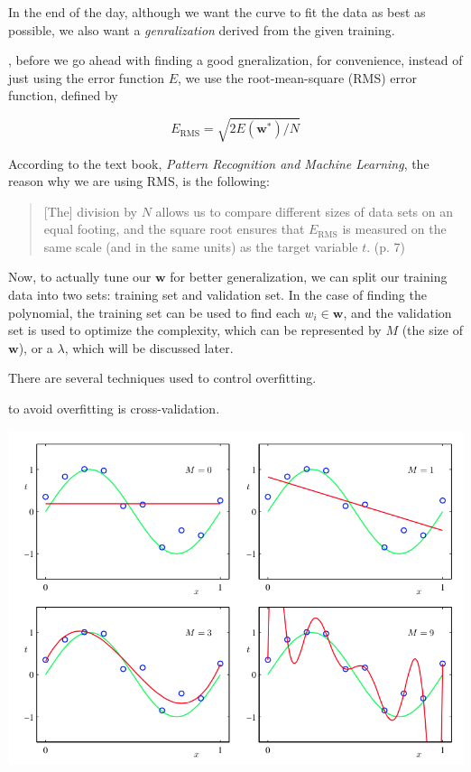 \documentclass{tufte-handout}
\begin{document}
In the end of the day, although we want the curve to fit the data as best as possible, we also want a \textit{genralization} derived from the given training.

, before we go ahead with finding a good gneralization, for convenience, instead of just using the error function $E$, we use the root-mean-square (RMS) error function, defined by

\begin{equation}
  E_{\text{RMS}} = \sqrt{2E(\mathbf{w}^*)/N}
\end{equation}

According to the text book, \textit{Pattern Recognition and Machine Learning}, the reason why we are using RMS, is the following:

\begin{quote}
  [The] division by $N$ allows us to compare different sizes of data sets on an equal footing, and the square root ensures that $E_{\text{RMS}}$ is measured on the same scale (and in the same units) as the target variable $t$. (p. 7)
\end{quote}

Now, to actually tune our $\mathbf{w}$ for better generalization, we can split our training data into two sets: training set and validation set. In the case of finding the polynomial, the training set can be used to find each $w_i \in
\mathbf{w}$, and the validation set is used to optimize the complexity, which
can be represented by $M$ (the size of $\mathbf{w}$), or a $\lambda$, which
will be discussed later.

There are several techniques used to control overfitting.

 to avoid overfitting is cross-validation.

\begin{marginfigure}
  \includegraphics[width=\linewidth]{oscillations.png}
  \caption{Visually, we see that the oscillation increases as $M$ increases.}
\end{marginfigure}
\end{document}
